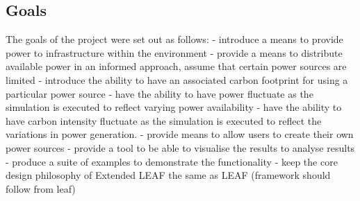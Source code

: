 \documentclass{l4proj}
\begin{document}

\subsection{Goals}\label{intro:subsec:goals}
The goals of the project were set out as follows:
- introduce a means to provide power to infrastructure within the environment
- provide a means to distribute available power in an informed approach, assume that certain power sources are limited
- introduce the ability to have an associated carbon footprint for using a particular power source
- have the ability to have power fluctuate as the simulation is executed to reflect varying power availability
- have the ability to have carbon intensity fluctuate as the simulation is executed to reflect the variations in power generation.
- provide means to allow users to create their own power sources
- provide a tool to be able to visualise the results to analyse results
- produce a suite of examples to demonstrate the functionality
- keep the core design philosophy of Extended LEAF the same as LEAF (framework should follow from leaf)
\end{document}
